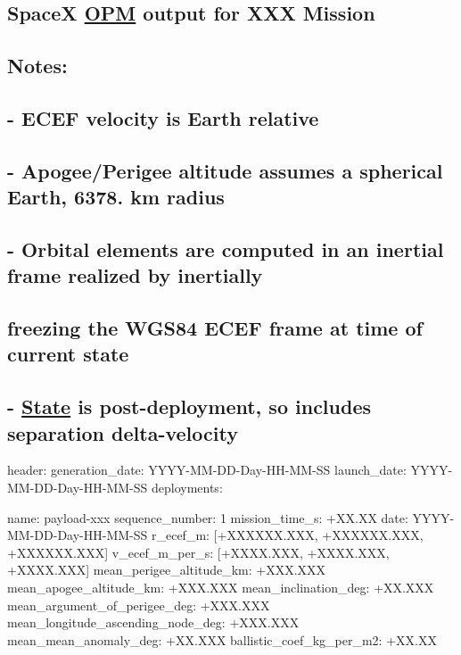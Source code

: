 \subsection*{SpaceX \hyperlink{classostk_1_1astro_1_1trajectory_1_1orbit_1_1messages_1_1spacex_1_1_o_p_m}{O\+PM} output for X\+XX Mission}

\subsection*{Notes\+:}

\subsection*{-\/ E\+C\+EF velocity is Earth relative}

\subsection*{-\/ Apogee/\+Perigee altitude assumes a spherical Earth, 6378. km radius}

\subsection*{-\/ Orbital elements are computed in an inertial frame realized by inertially}

\subsection*{freezing the W\+G\+S84 E\+C\+EF frame at time of current state}

\subsection*{-\/ \hyperlink{classostk_1_1astro_1_1trajectory_1_1_state}{State} is post-\/deployment, so includes separation delta-\/velocity}

header\+: generation\+\_\+date\+: Y\+Y\+Y\+Y-\/\+M\+M-\/\+D\+D-\/\+Day-\/\+H\+H-\/\+M\+M-\/\+SS launch\+\_\+date\+: Y\+Y\+Y\+Y-\/\+M\+M-\/\+D\+D-\/\+Day-\/\+H\+H-\/\+M\+M-\/\+SS deployments\+:
\begin{DoxyItemize}
\item name\+: payload-\/xxx sequence\+\_\+number\+: 1 mission\+\_\+time\+\_\+s\+: +\+XX.XX date\+: Y\+Y\+Y\+Y-\/\+M\+M-\/\+D\+D-\/\+Day-\/\+H\+H-\/\+M\+M-\/\+SS r\+\_\+ecef\+\_\+m\+: \mbox{[}+\+X\+X\+X\+X\+XX.X\+XX, +\+X\+X\+X\+X\+XX.X\+XX, +\+X\+X\+X\+X\+XX.X\+XX\mbox{]} v\+\_\+ecef\+\_\+m\+\_\+per\+\_\+s\+: \mbox{[}+\+X\+X\+XX.X\+XX, +\+X\+X\+XX.X\+XX, +\+X\+X\+XX.X\+XX\mbox{]} mean\+\_\+perigee\+\_\+altitude\+\_\+km\+: +\+X\+XX.X\+XX mean\+\_\+apogee\+\_\+altitude\+\_\+km\+: +\+X\+XX.X\+XX mean\+\_\+inclination\+\_\+deg\+: +\+XX.X\+XX mean\+\_\+argument\+\_\+of\+\_\+perigee\+\_\+deg\+: +\+X\+XX.X\+XX mean\+\_\+longitude\+\_\+ascending\+\_\+node\+\_\+deg\+: +\+X\+XX.X\+XX mean\+\_\+mean\+\_\+anomaly\+\_\+deg\+: +\+XX.X\+XX ballistic\+\_\+coef\+\_\+kg\+\_\+per\+\_\+m2\+: +\+XX.XX
\end{DoxyItemize}

